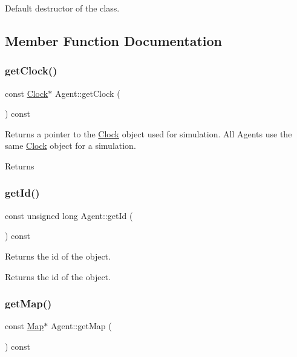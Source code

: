 Default destructor of the class. 

\subsection{Member Function Documentation}
\mbox{\label{class_agent_af80a21a067d04788c23d719d07b04038}} 
\subsubsection{\texorpdfstring{getClock()}{getClock()}}
{\footnotesize\ttfamily const \mbox{\hyperlink{class_clock}{Clock}}$\ast$ Agent\+::get\+Clock (\begin{DoxyParamCaption}{ }\end{DoxyParamCaption}) const}

Returns a pointer to the \mbox{\hyperlink{class_clock}{Clock}} object used for simulation. All Agents use the same \mbox{\hyperlink{class_clock}{Clock}} object for a simulation. \begin{DoxyReturn}{Returns}

\end{DoxyReturn}
\mbox{\label{class_agent_a51d2d781636f524dc151f3da10955613}} 
\subsubsection{\texorpdfstring{getId()}{getId()}}
{\footnotesize\ttfamily const unsigned long Agent\+::get\+Id (\begin{DoxyParamCaption}{ }\end{DoxyParamCaption}) const}

Returns the id of the object. \begin{DoxyReturn}{Returns}
the id of the object. 
\end{DoxyReturn}
\mbox{\label{class_agent_ad1870edeea33b059eca75079be2eb002}} 
\subsubsection{\texorpdfstring{getMap()}{getMap()}}
{\footnotesize\ttfamily const \mbox{\hyperlink{class_map}{Map}}$\ast$ Agent\+::get\+Map (\begin{DoxyParamCaption}{ }\end{DoxyParamCaption}) const}

